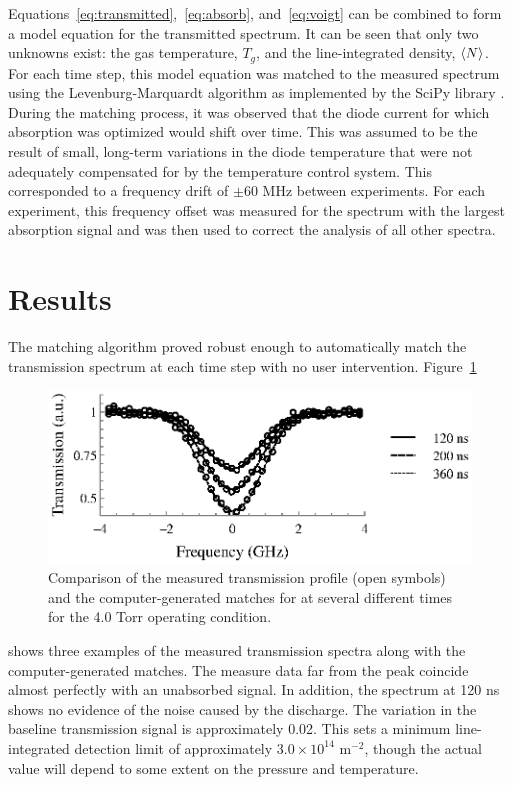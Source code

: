 Equations~\ref{eq:transmitted},~\ref{eq:absorb}, and~\ref{eq:voigt} can be
combined to form a model equation for the transmitted spectrum. It can be seen
that only two unknowns exist: the gas temperature, $T_g$, and the
line-integrated density, $\langle N \rangle$. For each time step, this model equation was
matched to the measured spectrum using the Levenburg-Marquardt algorithm
\cite{Marquardt1963} as implemented by the SciPy library \cite{Jones2001}.
During the matching process, it was observed that the diode current for which
absorption was optimized would shift over time. This was assumed to be the
result of small, long-term variations in the diode temperature that were not
adequately compensated for by the temperature control system. This corresponded
to a frequency drift of $\pm60$ MHz between experiments. For each experiment,
this frequency offset was measured for the spectrum with the largest absorption
signal and was then used to correct the analysis of all other spectra.

\section{Results}

The matching algorithm proved robust enough to automatically match the
transmission spectrum at each time step with no user intervention.
Figure~\ref{fig:matching}
\begin{figure}
  \centering
  \includegraphics{./chapters/metastables/figures/matching.eps}
  \caption{Comparison of the measured transmission profile (open symbols) and
  the computer-generated matches for at several different times for the 4.0 Torr
  operating condition.}
  \label{fig:matching}
\end{figure}
shows three examples of the measured transmission spectra along with the
computer-generated matches. The measure data far from the peak coincide almost
perfectly with an unabsorbed signal. In addition, the spectrum at 120 ns shows
no evidence of the noise caused by the discharge. The variation in the baseline
transmission signal is approximately 0.02. This sets a minimum line-integrated
detection limit of approximately $3.0 \times 10^{14}$ m$^{-2}$, though the
actual value will depend to some extent on the pressure and temperature.

